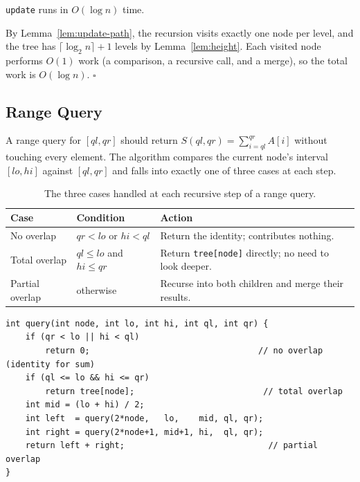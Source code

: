\documentclass[
  11pt,
  a4paper,
  twoside=false,
  numbers=noenddot,
  headings=big,
  parskip=half,
  toc=bibliography,
  toc=listof,
  bibliography=totoc
]{scrreprt}
\newenvironment{proof}[1][Proof]{\par\noindent{\bfseries\sffamily\color{navy}#1.}\enspace}{\hfill$\square$\par\medskip}
\newcommand{\Oh}[1]{O\!\left(#1\right)}
\newcommand{\tblhead}[1]{\textbf{\sffamily #1}}
\begin{document}
\begin{lem}\label{lem:update-time}
\texttt{update} runs in $\Oh{\log n}$ time.
\end{lem}
\begin{proof}
By Lemma~\ref{lem:update-path}, the recursion visits exactly one node per level, and the tree has $\lceil\log_2 n\rceil+1$ levels by Lemma~\ref{lem:height}. Each visited node performs $O(1)$ work (a comparison, a recursive call, and a merge), so the total work is $\Oh{\log n}$.
\end{proof}

\subsection{Range Query}
\label{sec:query}
A range query for $[ql,qr]$ should return $S(ql,qr) = \sum_{i=ql}^{qr} A[i]$ without touching every element. The algorithm compares the current node's interval $[lo,hi]$ against $[ql,qr]$ and falls into exactly one of three cases at each step.

\begin{table}[h]
\centering
\caption{The three cases handled at each recursive step of a range query.}
\label{tab:query-cases}
\begin{tabular}{>{\raggedright\arraybackslash}p{3.0cm}>{\raggedright\arraybackslash}p{4.6cm}p{5.0cm}}
\toprule
\tblhead{Case} & \tblhead{Condition} & \tblhead{Action} \\
\midrule
No overlap      & $qr < lo$ or $hi < ql$            & Return the identity; contributes nothing. \\
Total overlap   & $ql \le lo$ and $hi \le qr$        & Return \texttt{tree[node]} directly; no need to look deeper. \\
Partial overlap & otherwise                          & Recurse into both children and merge their results. \\
\bottomrule
\end{tabular}
\end{table}

\begin{lstlisting}[style=cpp, caption={Range query.}, label={alg:query}]
int query(int node, int lo, int hi, int ql, int qr) {
    if (qr < lo || hi < ql)
        return 0;                                  // no overlap (identity for sum)
    if (ql <= lo && hi <= qr)
        return tree[node];                          // total overlap
    int mid = (lo + hi) / 2;
    int left  = query(2*node,   lo,    mid, ql, qr);
    int right = query(2*node+1, mid+1, hi,  ql, qr);
    return left + right;                             // partial overlap
}
\end{lstlisting}
\end{document}
